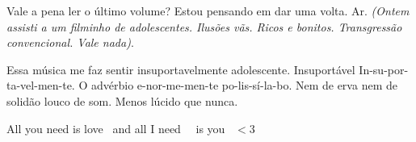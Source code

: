 \begin{poem}
\begin{stanza}
\qquad Vale a pena ler o último volume?\verseline
\qquad Estou pensando em dar uma volta.\verseline
\qquad Ar.\verseline
\textit{(Ontem assisti a um filminho de adolescentes. Ilusões vãs.\verseline
Ricos e bonitos. Transgressão convencional. Vale nada)}.
\end{stanza}
\begin{stanza}
Essa música me faz sentir insuportavelmente adolescente.\verseline
Insuportável \quad In-su-por-ta-vel-men-te.\verseline
O advérbio e-nor-me-men-te po-lis-sí-la-bo.\verseline
Nem de erva nem de solidão \qquad louco de som.\verseline
Menos lúcido que nunca.
\end{stanza}
\qquad All you need is love\verseline
\qquad \quad \  and all I need\verseline
\qquad \qquad \, \, is you\verseline
\qquad \qquad \quad \,    $<$3
\end{poem}